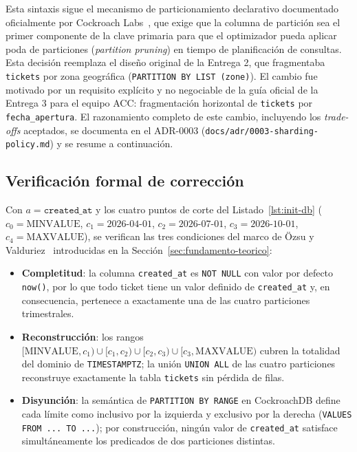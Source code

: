 Esta sintaxis sigue el mecanismo de particionamiento declarativo documentado oficialmente por
Cockroach Labs~\cite{cockroachlabs2024docs}, que exige que la columna de partición sea el primer
componente de la clave primaria para que el optimizador pueda aplicar poda de particiones
(\emph{partition pruning}) en tiempo de planificación de consultas. Esta decisión reemplaza el
diseño original de la Entrega 2, que fragmentaba \texttt{tickets} por
zona geográfica (\texttt{PARTITION BY LIST (zone)}). El cambio fue motivado por un requisito
explícito y no negociable de la guía oficial de la Entrega 3 para el equipo ACC: fragmentación
horizontal de \texttt{tickets} por \texttt{fecha\_apertura}. El razonamiento completo de este
cambio, incluyendo los \emph{trade-offs} aceptados, se documenta en el ADR-0003
(\texttt{docs/adr/0003-sharding-policy.md}) y se resume a continuación.

\subsection{Verificación formal de corrección}

Con $a = \texttt{created\_at}$ y los cuatro puntos de corte del Listado~\ref{lst:init-db}
($c_0 = \text{MINVALUE}$, $c_1 = \text{2026-04-01}$, $c_2 = \text{2026-07-01}$,
$c_3 = \text{2026-10-01}$, $c_4 = \text{MAXVALUE}$), se verifican las tres condiciones del
marco de Özsu y Valduriez~\cite{ozsu2011principles} introducidas en la
Sección~\ref{sec:fundamento-teorico}:

\begin{itemize}[leftmargin=1.5em]
    \item \textbf{Completitud}: la columna \texttt{created\_at} es \texttt{NOT NULL} con valor
        por defecto \texttt{now()}, por lo que todo ticket tiene un valor definido de
        \texttt{created\_at} y, en consecuencia, pertenece a exactamente una de las cuatro
        particiones trimestrales.
    \item \textbf{Reconstrucción}: los rangos
        $[\text{MINVALUE}, c_1) \cup [c_1, c_2) \cup [c_2, c_3) \cup [c_3, \text{MAXVALUE})$
        cubren la totalidad del dominio de \texttt{TIMESTAMPTZ}; la unión \texttt{UNION ALL} de
        las cuatro particiones reconstruye exactamente la tabla \texttt{tickets} sin pérdida de
        filas.
    \item \textbf{Disyunción}: la semántica de \texttt{PARTITION BY RANGE} en CockroachDB define
        cada límite como inclusivo por la izquierda y exclusivo por la derecha
        (\texttt{VALUES FROM ... TO ...}); por construcción, ningún valor de \texttt{created\_at}
        satisface simultáneamente los predicados de dos particiones distintas.
\end{itemize}

